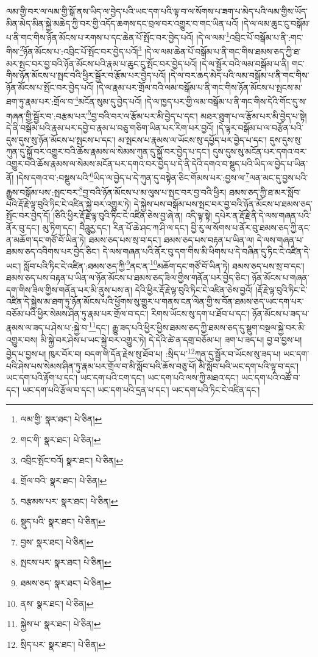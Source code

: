 ལམ་གྱི་བར་ལ་ལམ་གྱི་སྒོ་ནས་ཡིད་ལ་བྱེད་པའི་ཡང་དག་པའི་ལྟ་བ་ལ་སོགས་པ་ཟག་པ་མེད་པའི་ལམ་གྱིས་ཡོད་མིན་མེད་མིན་སྐྱེ་མཆེད་ཀྱི་བར་གྱི་འདོད་ཆགས་དང་བྲལ་བར་འགྱུར་བ་གང་ཡིན་པའོ། །དེ་ལ་ལམ་ཆུང་ངུ་བསྒོམ་པ་ནི་གང་གིས་ཉོན་མོངས་པ་རགས་པ་དང་ཆེན་པོ་སྤོང་བར་བྱེད་པའོ། །དེ་ལ་ལམ་\footnote{ལམ་གྱི་  སྣར་ཐང་།  པེ་ཅིན། }འབྲིང་པོ་བསྒོམ་པ་ནི་:གང་གིས་\footnote{གང་གི་  སྣར་ཐང་།  པེ་ཅིན། }ཉོན་མོངས་པ་:འབྲིང་པོ་སྤོང་བར་བྱེད་པའོ།\footnote{འབྲིང་སྤོང་བའོ།  སྣར་ཐང་།  པེ་ཅིན། } །དེ་ལ་ལམ་ཆེན་པོ་བསྒོམ་པ་ནི་གང་གིས་ཐམས་ཅད་ཀྱི་ཐ་མར་སྤང་བར་བྱ་བའི་ཉོན་མོངས་པའི་རྣམ་པ་ཆུང་ངུ་སྤོང་བར་བྱེད་པའོ། །དེ་ལ་སྦྱོར་བའི་ལམ་བསྒོམ་པ་ནི། གང་གིས་ཉོན་མོངས་པ་སྤང་བའི་ཕྱིར་སྦྱོར་བ་རྩོམ་པར་བྱེད་པའོ། །དེ་ལ་བར་ཆད་མེད་པའི་ལམ་བསྒོམ་པ་ནི་གང་གིས་ཉོན་མོངས་པ་སྤོང་བར་བྱེད་པའོ། །དེ་ལ་རྣམ་པར་གྲོལ་བའི་ལམ་བསྒོམ་པ་ནི་གང་གིས་ཉོན་མོངས་པ་སྤངས་མ་ཐག་ཏུ་རྣམ་པར་:གྲོལ་བ་\footnote{གྲོལ་བའི་  སྣར་ཐང་།  པེ་ཅིན། }མངོན་སུམ་དུ་བྱེད་པའོ། །དེ་ལ་ཁྱད་པར་གྱི་ལམ་བསྒོམ་པ་ནི་གང་གིས་དེའི་གོང་དུ་ས་གཞན་གྱི་སྦྱོར་བ་:བརྩམ་པར་\footnote{བརྩམས་པར་  སྣར་ཐང་།  པེ་ཅིན། }བྱ་བའི་བར་ལ་རྩོམ་པར་མི་བྱེད་པ་དང་། མཐར་ཐུག་པ་ལ་རྩོམ་པར་མི་བྱེད་པ་སྟེ། དེ་ནི་བསྒོམ་པའི་རྣམ་པར་དབྱེ་བ་རྣམ་པ་བཅུ་གཅིག་ཡིན་པར་རིག་པར་བྱའོ། །དེ་ལྟར་བསྒོམ་པ་ལ་བརྩོན་པའི་དུས་དུས་སུ་ཉོན་མོངས་པ་སྤངས་པ་དང་། མ་སྤངས་པ་རྣམས་ལ་ཡོངས་སུ་དཔྱོད་པར་བྱེད་པ་དང་། དུས་དུས་སུ་ཀུན་དུ་སྐྱོ་བར་འགྱུར་བའི་ཆོས་རྣམས་ལ་སེམས་ཀུན་དུ་སྐྱོ་བར་བྱེད་པ་དང་། དུས་དུས་སུ་མངོན་པར་དགའ་བར་འགྱུར་བའི་ཆོས་རྣམས་ལ་སེམས་མངོན་པར་དགའ་བར་བྱེད་པ་དེ་ནི་དེའི་དགའ་བ་སྡུད་པའི་ཡིད་ལ་བྱེད་པ་ཡིན་ནོ། །དེས་དགའ་བ་:བསྡུས་པའི་\footnote{སྡུད་པའི་  སྣར་ཐང་།  པེ་ཅིན། }ཡིད་ལ་བྱེད་པ་དེ་ཀུན་དུ་བསྟེན་ཅིང་གོམས་པར་:བྱས་ལ་\footnote{བྱས་  སྣར་ཐང་།  པེ་ཅིན། }ལན་མང་དུ་བྱས་པའི་རྒྱུས་བསྒོམ་པས་:སྤང་བར་\footnote{སྤངས་པར་  སྣར་ཐང་།  པེ་ཅིན། }བྱ་བའི་ཉོན་མོངས་པ་མ་ལུས་པ་སྤང་བར་བྱ་བའི་ཕྱིར། ཐམས་ཅད་ཀྱི་ཐ་མར་སློབ་པའི་རྡོ་རྗེ་ལྟ་བུའི་ཏིང་ངེ་འཛིན་སྐྱེ་བར་འགྱུར་ཏེ། དེ་སྐྱེས་པས་བསྒོམ་པས་སྤང་བར་བྱ་བའི་ཉོན་མོངས་པ་ཐམས་ཅད་སྤོང་བར་བྱེད་དོ། །ཅིའི་ཕྱིར་རྡོ་རྗེ་ལྟ་བུའི་ཏིང་ངེ་འཛིན་ཅེས་བྱ་ཞེ་ན། འདི་ལྟ་སྟེ། དཔེར་ན་རྡོ་རྗེ་ནི་དེ་ལས་གཞན་པའི་ནོར་བུ་དང་། མུ་ཏིག་དང་། བཻཌཱུརྱ་དང་། རིན་པོ་ཆེ་ཤང་ཀ་ཤི་ལ་དང་། བྱི་རུ་ལ་སོགས་པ་ནོར་བུ་ཐམས་ཅད་ཀྱི་ནང་ན་མཆོག་དང་གཙོ་བོ་ཡིན་ཏེ། ཐམས་ཅད་པས་སྲ་བ་དང་། ཐམས་ཅད་པས་བརྟན་པ་ཡིན་ལ། དེ་ལས་གཞན་པ་ཐམས་ཅད་འབིགས་པར་བྱེད་ཅིང་། དེ་ལས་གཞན་པའི་ནོར་བུ་དག་གིས་མི་ཕིགས་པ་དེ་བཞིན་དུ་ཏིང་ངེ་འཛིན་དེ་ཡང་། སློབ་པའི་ཏིང་ངེ་འཛིན་:ཐམས་ཅད་ཀྱི་\footnote{ཐམས་ཅད་  སྣར་ཐང་།  པེ་ཅིན། }ནང་ན་\footnote{ནས་  སྣར་ཐང་།  པེ་ཅིན། }མཆོག་དང་གཙོ་བོ་ཡིན་ཏེ། ཐམས་ཅད་པས་སྲ་བ་དང་། ཐམས་ཅད་པས་བརྟན་པ་ཡིན་ལ་ཉོན་མོངས་པ་ཐམས་ཅད་ཟིལ་གྱིས་གནོན་པར་བྱེད་ཅིང་། ཉོན་མོངས་པ་གཞན་དག་གིས་ཟིལ་གྱིས་གནོན་པར་མི་ནུས་པས་ན། དེའི་ཕྱིར་རྡོ་རྗེ་ལྟ་བུའི་ཏིང་ངེ་འཛིན་ཅེས་བྱའོ། །རྡོ་རྗེ་ལྟ་བུའི་ཏིང་ངེ་འཛིན་དེ་སྐྱེས་མ་ཐག་ཏུ་ཉོན་མོངས་པའི་ཕྱོགས་སུ་གྱུར་པ་གནས་ངན་ལེན་གྱི་ས་བོན་ཐམས་ཅད་ཡང་དག་པར་བཅོམ་པའི་ཕྱིར་སེམས་ཤིན་ཏུ་རྣམ་པར་གྲོལ་བ་དང་། རིགས་ཡོངས་སུ་དག་པ་ཐོབ་པ་དང་། ཉོན་མོངས་པ་ཟད་པ་རྣམས་ལ་ཟད་པ་ཤེས་པ་:སྐྱེ་བ་\footnote{སྐྱེས་པ་  སྣར་ཐང་།  པེ་ཅིན། }དང་། རྒྱུ་ཟད་པའི་ཕྱིར་ཕྱིས་ཐམས་ཅད་ཀྱི་ཐམས་ཅད་དུ་སྡུག་བསྔལ་སྐྱེ་བར་མི་འགྱུར་བས། མི་སྐྱེ་བར་ཤེས་པ་ཡང་སྐྱེ་བར་འགྱུར་ཏེ། དེ་དེའི་ཚེ་ན་དགྲ་བཅོམ་པ། ཟག་པ་ཟད་པ། བྱ་བ་བྱས་པ། བྱེད་པ་བྱས་པ། ཁུར་བོར་བ། བདག་གི་དོན་རྗེས་སུ་ཐོབ་པ། :སྲིད་པ་\footnote{སྲིད་པར་  སྣར་ཐང་།  པེ་ཅིན། }ཀུན་དུ་སྦྱོར་བ་ཡོངས་སུ་ཟད་པ། ཡང་དག་པའི་ཤེས་པས་སེམས་ཤིན་ཏུ་རྣམ་པར་གྲོལ་བ་མི་སློབ་པའི་ཆོས་བཅུ་པོ། མི་སློབ་པའི་ཡང་དག་པའི་ལྟ་བ་དང་། ཡང་དག་པའི་རྟོག་པ་དང་། ཡང་དག་པའི་ངག་དང་། ཡང་དག་པའི་ལས་ཀྱི་མཐའ་དང་། ཡང་དག་པའི་འཚོ་བ་དང་། ཡང་དག་པའི་རྩོལ་བ་དང་། ཡང་དག་པའི་དྲན་པ་དང་། ཡང་དག་པའི་ཏིང་ངེ་འཛིན་དང་། 